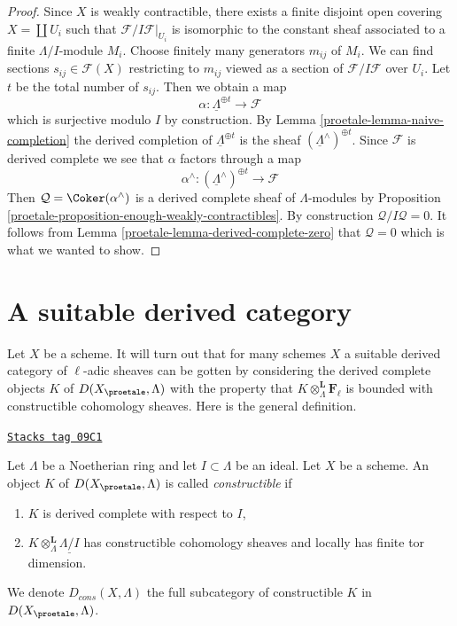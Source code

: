 \begin{proof}

Since $X$ is weakly contractible, there exists a finite disjoint open
covering $X = \coprod U_i$ such that $\mathcal{F}/I\mathcal{F}|_{U_i}$
is isomorphic to the constant sheaf associated to a finite $\Lambda/I$-module
$M_i$. Choose finitely many generators $m_{ij}$ of $M_i$. We
can find sections $s_{ij} \in \mathcal{F}(X)$ restricting to
$m_{ij}$ viewed as a section of $\mathcal{F}/I\mathcal{F}$ over $U_i$.
Let $t$ be the total number of $s_{ij}$. Then we obtain a map
$$
\alpha : \underline{\Lambda}^{\oplus t} \longrightarrow \mathcal{F}
$$
which is surjective modulo $I$ by construction. By
Lemma \ref{proetale-lemma-naive-completion}
the derived completion of $\underline{\Lambda}^{\oplus t}$ is the
sheaf $(\underline{\Lambda}^\wedge)^{\oplus t}$. Since $\mathcal{F}$
is derived complete we see that $\alpha$ factors through a map
$$
\alpha^\wedge :
(\underline{\Lambda}^\wedge)^{\oplus t}
\longrightarrow
\mathcal{F}
$$
Then $\mathcal{Q} = \Coker(\alpha^\wedge)$ is a derived complete
sheaf of $\Lambda$-modules by
Proposition \ref{proetale-proposition-enough-weakly-contractibles}.
By construction $\mathcal{Q}/I\mathcal{Q} = 0$. It follows from
Lemma \ref{proetale-lemma-derived-complete-zero}
that $\mathcal{Q} = 0$ which is what we wanted to show.
\end{proof}

\section{A suitable derived category}
\label{proetale-section-suitable-derived}
Let $X$ be a scheme. It will turn out that for many schemes $X$ a suitable
derived category of $\ell$-adic sheaves can be gotten by considering the
derived complete objects $K$ of $D(X_\proetale, \Lambda)$ with the property
that $K \otimes_\Lambda^\mathbf{L} \mathbf{F}_\ell$ is bounded with
constructible cohomology sheaves. Here is the general definition.

\begin{definition}[Dbc]
\label{proetale-definition-Dbc}
\href{https://stacks.math.columbia.edu/tag/09C1}{\texttt{Stacks tag 09C1}}

Let $\Lambda$ be a Noetherian ring and let $I \subset \Lambda$ be an ideal.
Let $X$ be a scheme. An object $K$ of $D(X_\proetale, \Lambda)$ is called
{\it constructible} if
\begin{enumerate}
\item $K$ is derived complete with respect to $I$,
\item $K \otimes_\Lambda^\mathbf{L} \underline{\Lambda/I}$
has constructible cohomology sheaves and locally has finite tor dimension.
\end{enumerate}
We denote $D_{cons}(X, \Lambda)$ the full subcategory of constructible
$K$ in $D(X_\proetale, \Lambda)$.
\end{definition}

